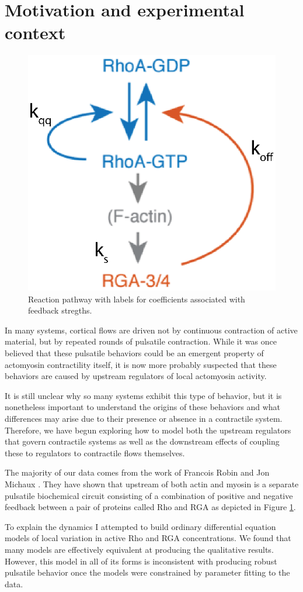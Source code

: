 \section{Motivation and experimental context}
\begin{figure}[h!]
	\centering
	\includegraphics[width=0.5\hsize]{pulse/diagram_eq.eps}
	\caption{\label{fig:pulse_diag}  Reaction pathway with labels for coefficients associated with feedback stregths.}
\end{figure}

In many systems, cortical flows are driven not by continuous contraction of active material, but by repeated rounds of pulsatile contraction.  While it was once believed that these pulsatile behaviors could be an emergent property of actomyosin contractility itself, it is now more probably suspected that these behaviors are caused by upstream regulators of local actomyosin activity.

It is still unclear why so many systems exhibit this type of behavior, but it is nonetheless important to understand the origins of these behaviors and what differences may arise due to their presence or absence in a contractile system.  Therefore, we have begun exploring how to model both the upstream regulators that govern contractile systems as well as the downstream effects of coupling these to regulators to contractile flows themselves.

The majority of our data comes from the work of Francois Robin and Jon Michaux \cite{Robin076356}.  They have shown that upstream of both actin and myosin is a separate pulsatile biochemical circuit consisting of a combination of positive and negative feedback between a pair of proteins called Rho and RGA as depicted in Figure \ref{fig:pulse_diag}.  

To explain the dynamics I attempted to build ordinary differential equation models of local variation in active Rho and RGA concentrations.  We found that many models are effectively equivalent at producing the qualitative results.  However, this model in all of its forms is inconsistent with producing robust pulsatile behavior once the models were constrained by parameter fitting to the data. 

